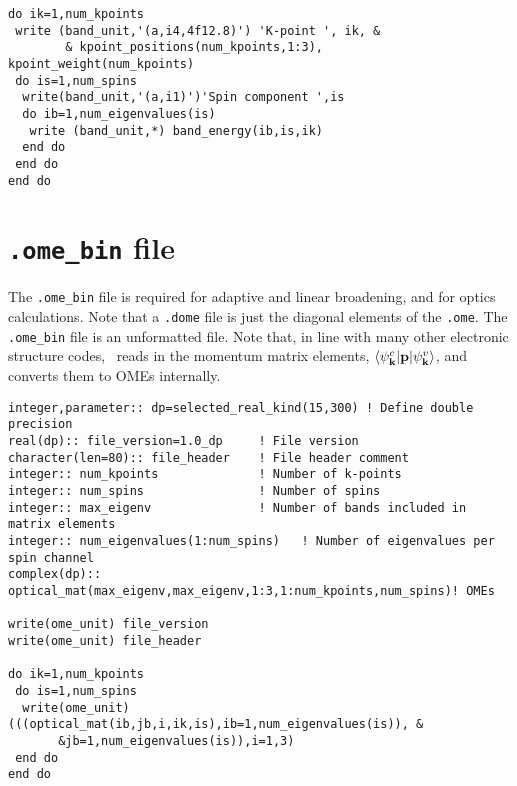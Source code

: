 \documentclass[a4paper,11pt,twoside]{book}
\begin{document}
{\begin{appendix}
\begin{verbatim}
do ik=1,num_kpoints
 write (band_unit,'(a,i4,4f12.8)') 'K-point ', ik, &
        & kpoint_positions(num_kpoints,1:3), kpoint_weight(num_kpoints)
 do is=1,num_spins
  write(band_unit,'(a,i1)')'Spin component ',is
  do ib=1,num_eigenvalues(is)
   write (band_unit,*) band_energy(ib,is,ik)
  end do
 end do
end do
\end{verbatim}
\section{\texttt{.ome\_bin} file}
The \texttt{.ome\_bin} file is required for adaptive and linear broadening, and for optics calculations.
%
Note that a \texttt{.dome} file is just the diagonal elements of the \texttt{.ome}.
%
The \texttt{.ome\_bin} file is an unformatted file.
%
Note that, in line with many other electronic structure codes, \optados\ reads in the momentum matrix elements, $\langle \psi^c_{\bf k}  |  {\bf p} | \psi^v_{\bf k} \rangle$, and converts them to OMEs internally.
\begin{verbatim}
integer,parameter:: dp=selected_real_kind(15,300) ! Define double precision
real(dp):: file_version=1.0_dp     ! File version
character(len=80):: file_header    ! File header comment
integer:: num_kpoints              ! Number of k-points
integer:: num_spins                ! Number of spins
integer:: max_eigenv               ! Number of bands included in matrix elements
integer:: num_eigenvalues(1:num_spins)   ! Number of eigenvalues per spin channel
complex(dp):: optical_mat(max_eigenv,max_eigenv,1:3,1:num_kpoints,num_spins)! OMEs

write(ome_unit) file_version
write(ome_unit) file_header

do ik=1,num_kpoints
 do is=1,num_spins
  write(ome_unit) (((optical_mat(ib,jb,i,ik,is),ib=1,num_eigenvalues(is)), &
       &jb=1,num_eigenvalues(is)),i=1,3)
 end do
end do
\end{verbatim}

\end{appendix}}
\end{document}
